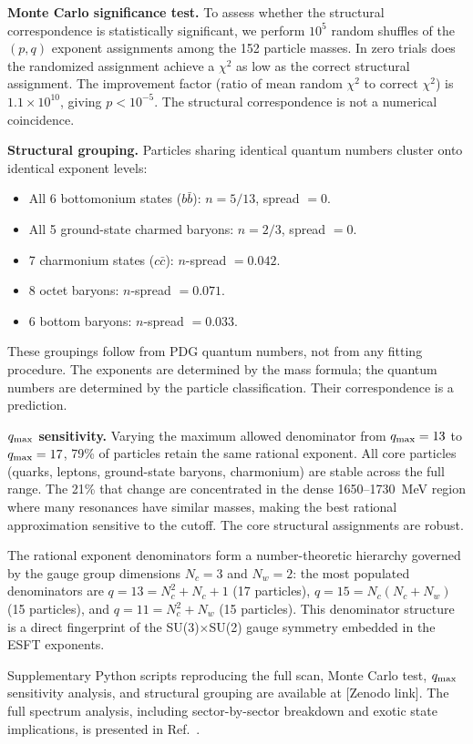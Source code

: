 ﻿\documentclass[twocolumn,preprintnumbers,amsmath,amssymb]{revtex4-2}
\begin{document}
\textbf{Monte Carlo significance test.} To assess whether the structural correspondence is statistically significant, we perform $10^5$ random shuffles of the $(p,q)$ exponent assignments among the 152 particle masses. In zero trials does the randomized assignment achieve a $\chi^2$ as low as the correct structural assignment. The improvement factor (ratio of mean random $\chi^2$ to correct $\chi^2$) is $1.1 \times 10^{10}$, giving $p < 10^{-5}$. The structural correspondence is not a numerical coincidence.

\textbf{Structural grouping.} Particles sharing identical quantum numbers cluster onto identical exponent levels:
\begin{itemize}
\item All 6 bottomonium states ($b\bar{b}$): $n = 5/13$, spread $= 0$.
\item All 5 ground-state charmed baryons: $n = 2/3$, spread $= 0$.
\item 7 charmonium states ($c\bar{c}$): $n$-spread $= 0.042$.
\item 8 octet baryons: $n$-spread $= 0.071$.
\item 6 bottom baryons: $n$-spread $= 0.033$.
\end{itemize}
These groupings follow from PDG quantum numbers, not from any fitting procedure. The exponents are determined by the mass formula; the quantum numbers are determined by the particle classification. Their correspondence is a prediction.

\textbf{$q_{\rm max}$ sensitivity.} Varying the maximum allowed denominator from $q_{\rm max} = 13$ to $q_{\rm max} = 17$, 79\% of particles retain the same rational exponent. All core particles (quarks, leptons, ground-state baryons, charmonium) are stable across the full range. The 21\% that change are concentrated in the dense 1650--1730~MeV region where many resonances have similar masses, making the best rational approximation sensitive to the cutoff. The core structural assignments are robust.

The rational exponent denominators form a number-theoretic hierarchy governed by the gauge group dimensions $N_c = 3$ and $N_w = 2$: the most populated denominators are $q = 13 = N_c^2 + N_c + 1$ (17 particles), $q = 15 = N_c(N_c + N_w)$ (15 particles), and $q = 11 = N_c^2 + N_w$ (15 particles). This denominator structure is a direct fingerprint of the SU(3)$\times$SU(2) gauge symmetry embedded in the ESFT exponents.

Supplementary Python scripts reproducing the full scan, Monte Carlo test, $q_{\rm max}$ sensitivity analysis, and structural grouping are available at [Zenodo link]. The full spectrum analysis, including sector-by-sector breakdown and exotic state implications, is presented in Ref.~\cite{Paper7}.
\end{document}
